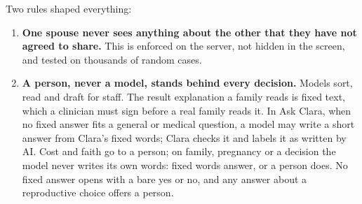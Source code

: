 \documentclass[10.5pt,a4paper]{article}
\begin{document}
Two rules shaped everything:

\begin{enumerate}
  \item \textbf{One spouse never sees anything about the other that they have not agreed to share.} This is enforced
        on the server, not hidden in the screen, and tested on thousands of random cases.
  \item \textbf{A person, never a model, stands behind every decision.} Models sort, read and draft for staff. The
        result explanation a family reads is fixed text, which a clinician must sign before a real family reads it.
        In Ask Clara, when no fixed answer fits a general or medical question, a model may write a short answer
        from Clara's fixed words; Clara checks it and labels it as written by AI. Cost and faith go to a person; on
        family, pregnancy or a decision the model never writes its own words: fixed words answer, or a person
        does. No fixed answer opens with a bare yes or no, and any answer about a reproductive choice offers a
        person.
\end{enumerate}
\end{document}
